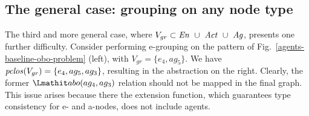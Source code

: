 %
%
%
%
%
%
%
%
%


\subsection{The general case: grouping on any node type}

The third and more general case, where \mbox{$V_{gr} \subset \mathit{En} ~\cup~ \mathit{Act} ~\cup~ \mathit{Ag}$}, presents one further  difficulty. Consider performing e-grouping on the pattern of Fig.~\ref{agents-baseline-obo-problem} (left), with \mbox{$V_{gr} = \{ e_4, ag_5 \}$}.
%
We have \mbox{$\mathit{pclos}(V_{gr}) = \{ e_4, ag_5, ag_3 \}$}, resulting in the abstraction on the right.
%
Clearly, the former $\delegate(ag_4, ag_3)$ relation should not be mapped in the final graph. 
%
This issue arises because there the extension function, which guarantees type consistency for e- and a-nodes, does not include agents. 
%

